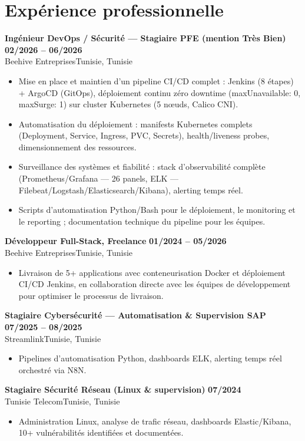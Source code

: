 \documentclass[a4paper,10pt]{article}
\newcommand{\cventry}[4]{\textbf{#1} \hfill \textbf{#4}\\[0.5pt]#2{\ifx\relax#3\relax\else, #3\fi}\par\vspace{1pt}}
\begin{document}
\section{Expérience professionnelle}
\cventry{Ingénieur DevOps / Sécurité --- Stagiaire PFE (mention Très Bien)}{Beehive Entreprises}{Tunisie}{02/2026 -- 06/2026}
\begin{itemize}
  \item Mise en place et maintien d'un pipeline CI/CD complet : Jenkins (8 étapes) + ArgoCD (GitOps), déploiement continu zéro downtime (maxUnavailable: 0, maxSurge: 1) sur cluster Kubernetes (5 nœuds, Calico CNI).
  \item Automatisation du déploiement : manifests Kubernetes complets (Deployment, Service, Ingress, PVC, Secrets), health/liveness probes, dimensionnement des ressources.
  \item Surveillance des systèmes et fiabilité : stack d'observabilité complète (Prometheus/Grafana --- 26 panels, ELK --- Filebeat/Logstash/Elasticsearch/Kibana), alerting temps réel.
  \item Scripts d'automatisation Python/Bash pour le déploiement, le monitoring et le reporting ; documentation technique du pipeline pour les équipes.
\end{itemize}
\cventry{Développeur Full-Stack, Freelance}{Beehive Entreprises}{Tunisie}{01/2024 -- 05/2026}
\begin{itemize}
  \item Livraison de 5+ applications avec conteneurisation Docker et déploiement CI/CD Jenkins, en collaboration directe avec les équipes de développement pour optimiser le processus de livraison.
\end{itemize}
\cventry{Stagiaire Cybersécurité --- Automatisation \& Supervision SAP}{Streamlink}{Tunisie}{07/2025 -- 08/2025}
\begin{itemize}
  \item Pipelines d'automatisation Python, dashboards ELK, alerting temps réel orchestré via N8N.
\end{itemize}
\cventry{Stagiaire Sécurité Réseau (Linux \& supervision)}{Tunisie Telecom}{Tunisie}{07/2024}
\begin{itemize}
  \item Administration Linux, analyse de trafic réseau, dashboards Elastic/Kibana, 10+ vulnérabilités identifiées et documentées.
\end{itemize}
\end{document}

